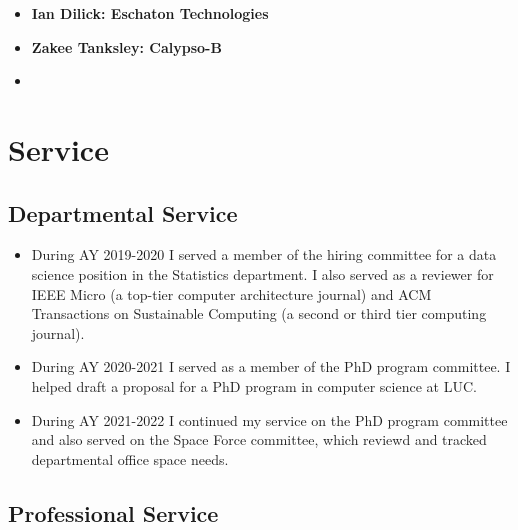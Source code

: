 \documentclass[10pt,onecolumn]{article}
\begin{document}
\begin{itemize}
\item \textbf{Ian Dilick: Eschaton Technologies}
\item \textbf{Zakee Tanksley: Calypso-B}
\item \textbf{}
\end{itemize}



\section{Service}


\subsection{Departmental Service}

\begin{itemize}
\item During AY 2019-2020 I served a member of the hiring committee for a data science position in the Statistics department.
I also served as a reviewer for IEEE Micro (a top-tier computer architecture journal) and ACM Transactions on Sustainable Computing (a second or third tier computing journal).

\item During AY 2020-2021 I served as a member of the PhD program committee.
I helped draft a proposal for a PhD program in computer science at LUC. 

\item During AY 2021-2022 I continued my service on the PhD program committee and also served on the Space Force committee, which reviewd and tracked departmental office space needs.
\end{itemize}


\subsection{Professional Service}



 
\end{document}
